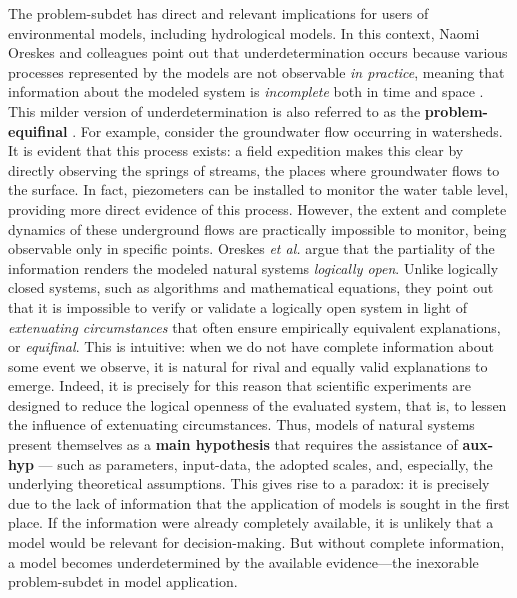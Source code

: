 \documentclass[./main_en.tex]{subfiles}
\begin{document}
\par The \gls{problem-subdet} has direct and relevant implications for users of environmental models, including hydrological models. In this context, Naomi Oreskes and colleagues point out that underdetermination occurs because various processes represented by the models are not observable \textit{in practice}, meaning that information about the modeled \gls{system} is \textit{incomplete} both in time and space \cite{Oreskes1994}. This milder version of underdetermination is also referred to as the \textbf{\gls{problem-equifinal}} \cite{Beven2006}. For example, consider the groundwater flow occurring in watersheds. It is evident that this process exists: a field expedition makes this clear by directly observing the springs of streams, the places where groundwater flows to the surface. In fact, piezometers can be installed to monitor the water table level, providing more direct evidence of this process. However, the extent and complete dynamics of these underground flows are practically impossible to monitor, being observable only in specific points. Oreskes \textit{et al.} argue that the partiality of the information renders the modeled natural systems \textit{logically open}. Unlike logically closed systems, such as algorithms and mathematical equations, they point out that it is impossible to verify or validate a logically open \gls{system} in light of \textit{extenuating circumstances} that often ensure empirically equivalent explanations, or \textit{equifinal}. This is intuitive: when we do not have complete information about some event we observe, it is natural for rival and equally valid explanations to emerge. Indeed, it is precisely for this reason that scientific experiments are designed to reduce the logical openness of the evaluated \gls{system}, that is, to lessen the influence of extenuating circumstances. Thus, models of natural systems present themselves as a \textbf{main hypothesis} that requires the assistance of \textbf{\gls{aux-hyp}} — such as \gls{parameters}, \gls{input-data}, the adopted scales, and, especially, the underlying theoretical assumptions. This gives rise to a paradox: it is precisely due to the lack of information that the application of models is sought in the first place. If the information were already completely available, it is unlikely that a \gls{model} would be relevant for decision-making. But without complete information, a \gls{model} becomes underdetermined by the available evidence—the inexorable \gls{problem-subdet} in model application.
\end{document}
